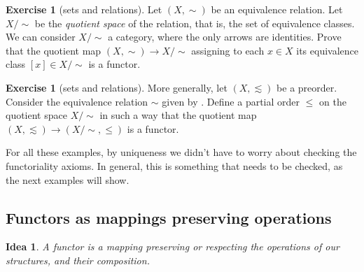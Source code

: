 \documentclass[12pt,oneside]{scrbook}
\numberwithin{equation}{section}
\theoremstyle{plain}
\newtheorem*{idea}{Idea}
\theoremstyle{definition}
\newtheorem{ex}[thm]{Exercise}
\DeclareMathOperator{\1}{\mathbbm{1}}
\DeclareMathOperator{\2}{\mathbbm{2}}
\begin{document}
\begin{ex}[sets and relations]\label{quotient}
 Let $(X,\sim)$ be an equivalence relation. Let $X/\sim$ be the \emph{quotient space} of the relation, that is, the set of equivalence classes. We can consider $X/\sim$ a category, where the only arrows are identities. Prove that the quotient map $(X,\sim)\to X/\sim$ assigning to each $x\in X$ its equivalence class $[x]\in X/\sim$ is a functor.
\end{ex}

\begin{ex}[sets and relations]
 More generally, let $(X,\lesssim)$ be a preorder. Consider the equivalence relation $\sim$ given by . Define a partial order $\le$ on the quotient space $X/\sim$ in such a way that the quotient map $(X,\lesssim)\to (X/\sim, \le)$ is a functor. 
\end{ex}

For all these examples, by uniqueness we didn't have to worry about checking the functoriality axioms. In general, this is something that needs to be checked, as the next examples will show.


\subsection{Functors as mappings preserving operations}

\begin{idea}
 A functor is a mapping preserving or respecting the operations of our structures, and their composition.
\end{idea}
\end{document}
